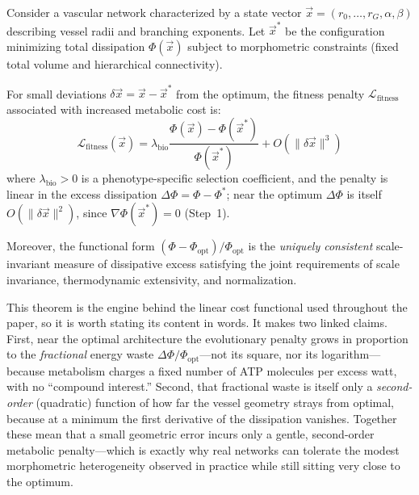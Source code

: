 \begin{theorem}
\label{thm:onsager}
Consider a vascular network characterized by a state vector $\vec{x} = (r_0,
\ldots, r_G, \alpha, \beta)$ describing vessel radii and branching exponents.
Let $\vec{x}^*$ be the configuration minimizing total dissipation
$\Phi(\vec{x})$ subject to morphometric constraints (fixed total volume and
hierarchical connectivity).

For small deviations $\delta\vec{x} = \vec{x} - \vec{x}^*$ from the optimum, the
fitness penalty $\mathcal{L}_{\mathrm{fitness}}$ associated with increased
metabolic cost is:
\begin{equation}
    \mathcal{L}_{\mathrm{fitness}}(\vec{x})
    = \lambda_{\mathrm{bio}} \frac{\Phi(\vec{x}) - \Phi(\vec{x}^*)}{\Phi(\vec{x}^*)}
    + O\left(\|\delta\vec{x}\|^3\right)
\end{equation}
where $\lambda_{\mathrm{bio}} > 0$ is a phenotype-specific selection
coefficient, and the penalty is linear in the excess dissipation
$\Delta\Phi=\Phi-\Phi^*$; near the optimum $\Delta\Phi$ is itself
$O(\|\delta\vec{x}\|^2)$, since $\nabla\Phi(\vec{x}^*)=0$ (Step~1).

Moreover, the functional form $(\Phi - \Phi_{\mathrm{opt}})/\Phi_{\mathrm{opt}}$
is the \emph{uniquely consistent} scale-invariant measure of dissipative excess
satisfying the joint requirements of scale invariance, thermodynamic
extensivity, and normalization.
\end{theorem}

This theorem is the engine behind the linear cost functional used
throughout the paper, so it is worth stating its content in words. It makes two
linked claims. First, near the optimal architecture the evolutionary penalty
grows in proportion to the \emph{fractional} energy waste
$\Delta\Phi/\Phi_{\mathrm{opt}}$---not its square, nor its logarithm---because
metabolism charges a fixed number of ATP molecules per excess watt, with no
``compound interest.'' Second, that fractional waste is itself only a
\emph{second-order} (quadratic) function of how far the vessel geometry strays
from optimal, because at a minimum the first derivative of the dissipation
vanishes. Together these mean that a small geometric error incurs only a gentle,
second-order metabolic penalty---which is exactly why real networks can tolerate
the modest morphometric heterogeneity observed in practice while still sitting
very close to the optimum.

